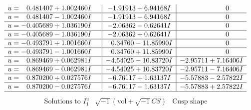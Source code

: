 \documentclass[1p]{elsarticle_modified}
\theoremstyle{definition}
\newcommand{\I}{\sqrt{-1}}
\begin{document}
$$\begin{array}{c|c|c}
\begin{aligned}
u &= \phantom{-}0.481407 + 1.002460 I\end{aligned}
 & -1.91913 + 6.94168 I & \phantom{-0.000000 } 0 \\ \hline\begin{aligned}
u &= \phantom{-}0.481407 - 1.002460 I\end{aligned}
 & -1.91913 - 6.94168 I & \phantom{-0.000000 } 0 \\ \hline\begin{aligned}
u &= -0.405689 + 1.036190 I\end{aligned}
 & -2.06362 - 0.62641 I & \phantom{-0.000000 } 0 \\ \hline\begin{aligned}
u &= -0.405689 - 1.036190 I\end{aligned}
 & -2.06362 + 0.62641 I & \phantom{-0.000000 } 0 \\ \hline\begin{aligned}
u &= -0.493791 + 1.001660 I\end{aligned}
 & \phantom{-}0.34760 - 11.85990 I & \phantom{-0.000000 } 0 \\ \hline\begin{aligned}
u &= -0.493791 - 1.001660 I\end{aligned}
 & \phantom{-}0.34760 + 11.85990 I & \phantom{-0.000000 } 0 \\ \hline\begin{aligned}
u &= \phantom{-}0.869469 + 0.062981 I\end{aligned}
 & -4.54025 - 10.83720 I & -2.95711 + 7.16406 I \\ \hline\begin{aligned}
u &= \phantom{-}0.869469 - 0.062981 I\end{aligned}
 & -4.54025 + 10.83720 I & -2.95711 - 7.16406 I \\ \hline\begin{aligned}
u &= \phantom{-}0.870200 + 0.027576 I\end{aligned}
 & -6.76117 + 1.63137 I & -5.57883 - 2.57822 I \\ \hline\begin{aligned}
u &= \phantom{-}0.870200 - 0.027576 I\end{aligned}
 & -6.76117 - 1.63137 I & -5.57883 + 2.57822 I\\
 \hline 
 \end{array}$$\newpage$$\begin{array}{c|c|c}  
\text{Solutions to }I^u_{1}& \I (\text{vol} + \sqrt{-1}CS) & \text{Cusp shape}\\

\end{array}$$
\end{document}
